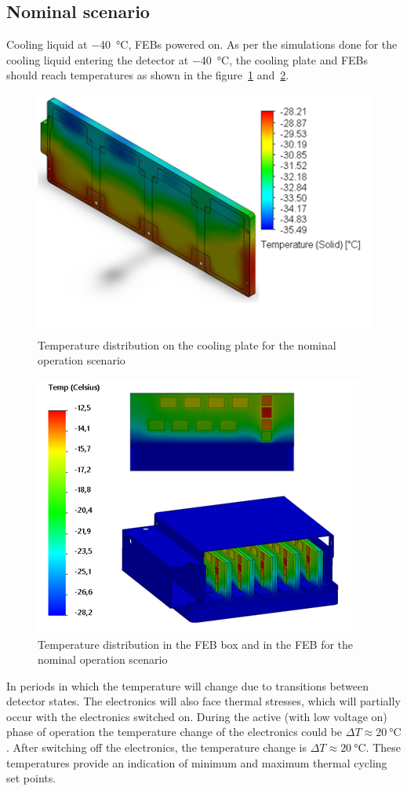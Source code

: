 \subsection{Nominal scenario}
Cooling liquid at \SI{-40}{\celsius}, \gls{FEB}s powered on.
    As per the simulations done for the cooling liquid entering the detector at  \SI{-40}{\celsius}, the cooling plate and \gls{FEB}s should reach temperatures as shown in the figure~\ref{fig_coolinkg_block_nominal} and~\ref{fig_nominal_febs}.
\begin{figure}[!h]
\centering
\includegraphics[width=0.5\columnwidth]{Chapter4/images/cooling_block_nominal.png}
\caption{Temperature distribution on the cooling plate for the nominal operation scenario}
\label{fig_coolinkg_block_nominal}
\end{figure}
\begin{figure}[!h]
\centering
\includegraphics[width=0.5\columnwidth]{Chapter4/images/nominal_febs.png}
\caption{Temperature distribution in the \gls{FEB} box and in the \gls{FEB} for the nominal operation scenario}
\label{fig_nominal_febs}
\end{figure}
In periods in which the temperature will change due to transitions between detector states. The electronics will also face thermal stresses, which will partially occur with the electronics switched on. During the active (with low voltage on) phase of operation the temperature change of the electronics could be $\Delta T \approx \SI{20}{\celsius}$. After switching off the electronics, the temperature change is $\Delta T \approx \SI{20}{\celsius}$. These temperatures provide an indication of minimum and maximum thermal cycling set points.  

